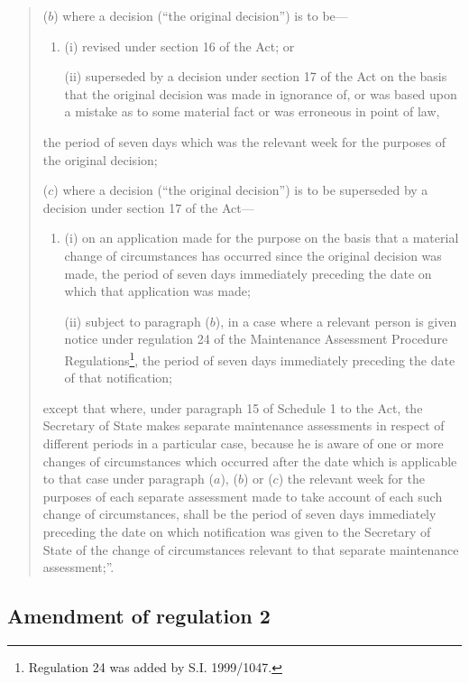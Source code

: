 \documentclass[12pt,a4paper]{article}
\begin{document}
\begin{enumerate}
\begin{quotation}
\begin{enumerate}
    ($b$)
    where a decision (“the original decision”) is to be—
\begin{enumerate}\item[]
    (i)
    revised under section 16 of the Act; or

    (ii)
    superseded by a decision under section 17 of the Act on the basis that the original decision was made in ignorance of, or was based upon a mistake as to some material fact or was erroneous in point of law,
\end{enumerate}
    the period of seven days which was the relevant week for the purposes of the original decision;

    ($c$)
    where a decision (“the original decision”) is to be superseded by a decision under section 17 of the Act—
\begin{enumerate}\item[]
    (i)
    on an application made for the purpose on the basis that a material change of circumstances has occurred since the original decision was made, the period of seven days immediately preceding the date on which that application was made;

    (ii)
    subject to paragraph ($b$), in a case where a relevant person is given notice under regulation 24 of the Maintenance Assessment Procedure Regulations\footnote{\frenchspacing Regulation 24 was added by S.I. 1999/1047.}, the period of seven days immediately preceding the date of that notification;
\end{enumerate}
\end{enumerate}
    except that where, under paragraph 15 of Schedule 1 to the Act, the Secretary of State makes separate maintenance assessments in respect of different periods in a particular case, because he is aware of one or more changes of circumstances which occurred after the date which is applicable to that case under paragraph ($a$), ($b$) or ($c$) the relevant week for the purposes of each separate assessment made to take account of each such change of circumstances, shall be the period of seven days immediately preceding the date on which notification was given to the Secretary of State of the change of circumstances relevant to that separate maintenance assessment;”. 
\end{quotation}
\end{enumerate}

\subsection[15. Amendment of regulation 2]{Amendment of regulation 2}
\end{document}
